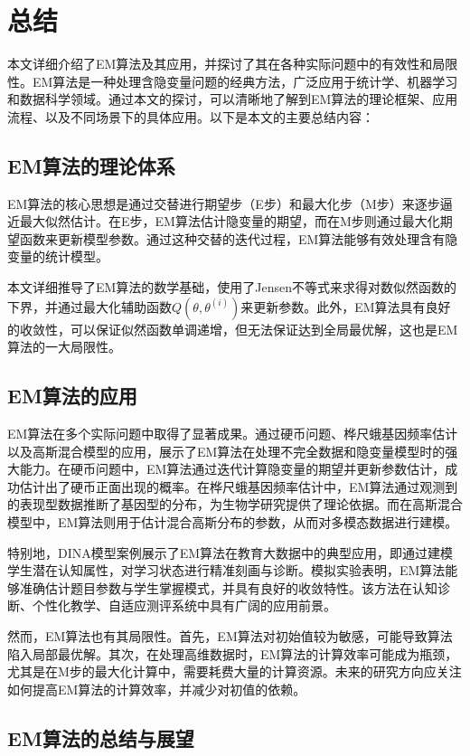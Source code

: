 \documentclass[a4paper,12pt]{ctexart} %
\begin{document}
\section{总结}

本文详细介绍了EM算法及其应用，并探讨了其在各种实际问题中的有效性和局限性。EM算法是一种处理含隐变量问题的经典方法，广泛应用于统计学、机器学习和数据科学领域。通过本文的探讨，可以清晰地了解到EM算法的理论框架、应用流程、以及不同场景下的具体应用。以下是本文的主要总结内容：

\subsection{EM算法的理论体系}

EM算法的核心思想是通过交替进行期望步（E步）和最大化步（M步）来逐步逼近最大似然估计。在E步，EM算法估计隐变量的期望，而在M步则通过最大化期望函数来更新模型参数。通过这种交替的迭代过程，EM算法能够有效处理含有隐变量的统计模型。

本文详细推导了EM算法的数学基础，使用了Jensen不等式来求得对数似然函数的下界，并通过最大化辅助函数$Q(\theta, \theta^{(i)})$来更新参数。此外，EM算法具有良好的收敛性，可以保证似然函数单调递增，但无法保证达到全局最优解，这也是EM算法的一大局限性。

\subsection{EM算法的应用}

EM算法在多个实际问题中取得了显著成果。通过硬币问题、桦尺蛾基因频率估计以及高斯混合模型的应用，展示了EM算法在处理不完全数据和隐变量模型时的强大能力。在硬币问题中，EM算法通过迭代计算隐变量的期望并更新参数估计，成功估计出了硬币正面出现的概率。在桦尺蛾基因频率估计中，EM算法通过观测到的表现型数据推断了基因型的分布，为生物学研究提供了理论依据。而在高斯混合模型中，EM算法则用于估计混合高斯分布的参数，从而对多模态数据进行建模。

特别地，DINA模型案例展示了EM算法在教育大数据中的典型应用，即通过建模学生潜在认知属性，对学习状态进行精准刻画与诊断。模拟实验表明，EM算法能够准确估计题目参数与学生掌握模式，并具有良好的收敛特性。该方法在认知诊断、个性化教学、自适应测评系统中具有广阔的应用前景。


然而，EM算法也有其局限性。首先，EM算法对初始值较为敏感，可能导致算法陷入局部最优解。其次，在处理高维数据时，EM算法的计算效率可能成为瓶颈，尤其是在M步的最大化计算中，需要耗费大量的计算资源。未来的研究方向应关注如何提高EM算法的计算效率，并减少对初值的依赖。

\subsection{EM算法的总结与展望}
\end{document}
